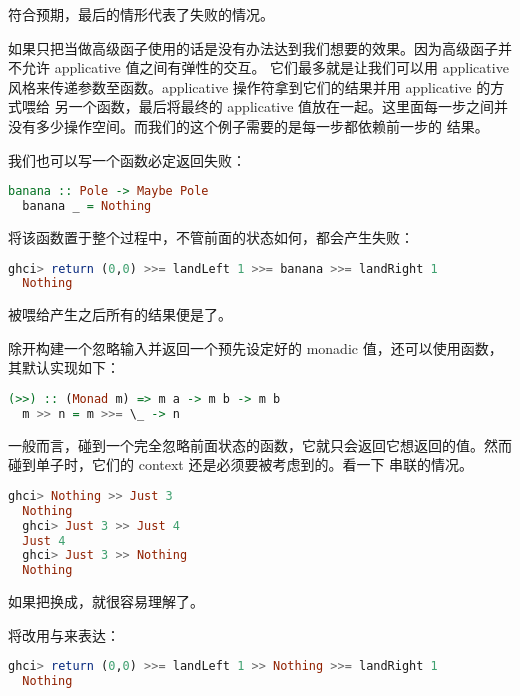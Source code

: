 \documentclass[./main.tex]{subfiles}
\begin{document}
符合预期，最后的情形代表了失败的情况。

如果只把当做高级函子使用的话是没有办法达到我们想要的效果。因为高级函子并不允许 applicative 值之间有弹性的交互。
它们最多就是让我们可以用 applicative 风格来传递参数至函数。applicative 操作符拿到它们的结果并用 applicative 的方式喂给
另一个函数，最后将最终的 applicative 值放在一起。这里面每一步之间并没有多少操作空间。而我们的这个例子需要的是每一步都依赖前一步的
结果。

我们也可以写一个函数必定返回失败：

\begin{lstlisting}[language=Haskell]
  banana :: Pole -> Maybe Pole
  banana _ = Nothing
\end{lstlisting}

将该函数置于整个过程中，不管前面的状态如何，都会产生失败：

\begin{lstlisting}[language=Haskell]
  ghci> return (0,0) >>= landLeft 1 >>= banana >>= landRight 1
  Nothing
\end{lstlisting}

被喂给产生之后所有的结果便是了。

除开构建一个忽略输入并返回一个预先设定好的 monadic 值，还可以使用\acode{>>}函数，其默认实现如下：

\begin{lstlisting}[language=Haskell]
  (>>) :: (Monad m) => m a -> m b -> m b
  m >> n = m >>= \_ -> n
\end{lstlisting}

一般而言，碰到一个完全忽略前面状态的函数，它就只会返回它想返回的值。然而碰到单子时，它们的 context 还是必须要被考虑到的。看一下
\acode{>>}串联的情况。

\begin{lstlisting}[language=Haskell]
  ghci> Nothing >> Just 3
  Nothing
  ghci> Just 3 >> Just 4
  Just 4
  ghci> Just 3 >> Nothing
  Nothing
\end{lstlisting}

如果把\acode{>>}换成\acode{>>= \\_ ->}，就很容易理解了。

将改用\acode{>>}与来表达：

\begin{lstlisting}[language=Haskell]
  ghci> return (0,0) >>= landLeft 1 >> Nothing >>= landRight 1
  Nothing
\end{lstlisting}
\end{document}
